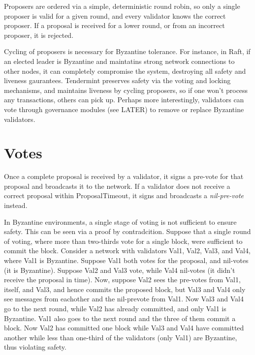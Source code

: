 Proposers are ordered via a simple, deterministic round robin, 
so only a single proposer is valid for a given round, 
and every validator knows the correct proposer. 
If a proposal is received for a lower round, or from an incorrect proposer, it is rejected.

Cycling of proposers is necessary for Byzantine tolerance. 
For instance, in Raft, if an elected leader is Byzantine and maintatins strong network connections to other nodes,
it can completely compromise the system, destroying all safety and liveness gaurantees.
Tendermint preserves safety via the voting and locking mechanisms, 
and maintains liveness by cycling proposers, so if one won't process any transactions, others can pick up.
Perhaps more interestingly, validators can vote through governance modules (see LATER) to remove or replace Byzantine validators.

\iffalse
TODO: move the tuning comment 
Upon entering a new round, validators wait ProposalTimeout to receive a complete proposal before broadcasting their pre-vote.
The ProposalTimeout thus serves as a critical paramter for tuning the performance of the system,
as it determines how much latency is permitted from proposers before validators start voting to skip them.
\fi

\section{Votes}

Once a complete proposal is received by a validator, 
it signs a pre-vote for that proposal and broadcasts it to the network.
If a validator does not receive a correct proposal within ProposalTimeout, 
it signs and broadcasts a \emph{nil-pre-vote} instead.

In Byzantine environments, a single stage of voting is not sufficient to ensure safety.
This can be seen via a proof by contradcition.
Suppose that a single round of voting, where more than two-thirds vote for a single block, were sufficient to commit the block.
Consider a network with validators Val1, Val2, Val3, and Val4, where Val1 is Byzantine.
Suppose Val1 both votes for the proposal, and nil-votes (it is Byzantine).
Suppose Val2 and Val3 vote, while Val4 nil-votes (it didn't receive the proposal in time).
Now, suppose Val2 sees the pre-votes from Val1, itself, and Val3, and hence commits the proposed block,
but Val3 and Val4 only see messages from eachother and the nil-prevote from Val1.
Now Val3 and Val4 go to the next round, while Val2 has already committed, and only Val1 is Byzantine.
Val1 also goes to the next round and the three of them commit a block.
Now Val2 has committed one block while Val3 and Val4 have committed another while less than one-third of the validators (only Val1) are Byzantine,
thus violating safety. 

